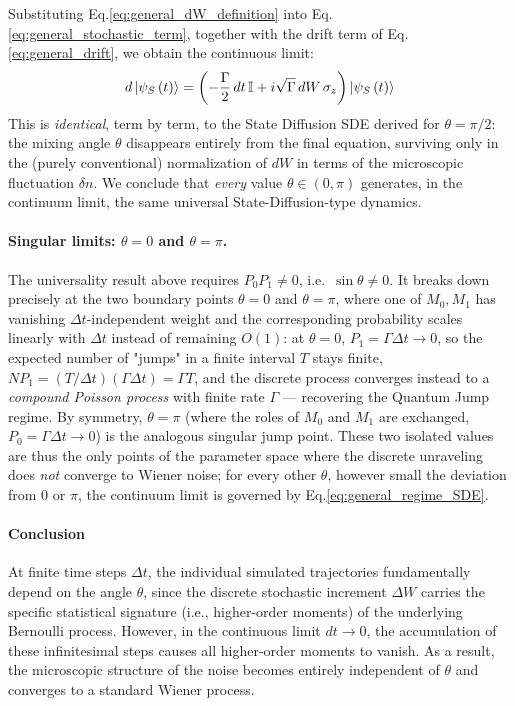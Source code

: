 \documentclass[a4paper,12pt]{article}
\begin{document}
Substituting Eq.\ref{eq:general_dW_definition} into 
Eq.\ref{eq:general_stochastic_term}, together with the drift term of 
Eq.\ref{eq:general_drift}, we obtain the continuous limit:
\begin{equation}
	d\ket{\psi_{S}\left(t\right)} = \left( -\frac{\Gamma}{2}\,dt\,\mathbb{I} 
	+ i\sqrt{\Gamma}\,dW\,\sigma_{z} \right) \ket{\psi_{S}\left(t\right)}
	\label{eq:general_regime_SDE}
\end{equation}
This is \emph{identical}, term by term, to the State Diffusion SDE derived for 
$\theta=\pi/2$: the mixing angle $\theta$ disappears entirely from the final equation, 
surviving only in the (purely conventional) normalization of $dW$ in terms of the 
microscopic fluctuation $\delta n$. We conclude that \emph{every} value 
$\theta \in (0,\pi)$ generates, in the continuum limit, the same universal 
State-Diffusion-type dynamics.

\paragraph{Singular limits: $\theta=0$ and $\theta=\pi$.}
The universality result above requires $P_{0}P_{1}\neq 0$, i.e.\ $\sin\theta \neq 0$. 
It breaks down precisely at the two boundary points $\theta=0$ and $\theta=\pi$, where 
one of $M_{0},M_{1}$ has vanishing $\Delta t$-independent weight and the corresponding 
probability scales linearly with $\Delta t$ instead of remaining $O(1)$: at $\theta=0$, 
$P_{1}=\Gamma\Delta t \to 0$, so the expected number of "jumps" in a finite interval 
$T$ stays finite, $N P_{1} = (T/\Delta t)(\Gamma\Delta t) = \Gamma T$, and the discrete 
process converges instead to a \emph{compound Poisson process} with finite rate 
$\Gamma$ — recovering the Quantum Jump regime. By symmetry, $\theta=\pi$ (where the 
roles of $M_{0}$ and $M_{1}$ are exchanged, $P_{0}=\Gamma\Delta t\to0$) is the analogous 
singular jump point. These two isolated values are thus the only points of the 
parameter space where the discrete unraveling does \emph{not} converge to Wiener noise; 
for every other $\theta$, however small the deviation from $0$ or $\pi$, the continuum 
limit is governed by Eq.\ref{eq:general_regime_SDE}.
\paragraph{Conclusion}
At finite time steps $\Delta t$, the individual simulated trajectories fundamentally depend on the angle $\theta$, since the discrete stochastic increment $ \Delta W$ carries the specific statistical signature (i.e., higher-order moments) of the underlying Bernoulli process. However, in the continuous limit $dt \to 0$, the accumulation of these infinitesimal steps causes all higher-order moments to vanish. As a result, the microscopic structure of the noise becomes entirely independent of $\theta$ and converges to a standard Wiener process. 
\end{document}
